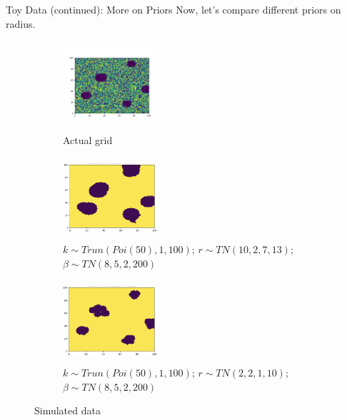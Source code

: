 \documentclass[10pt,mathserif]{beamer}
\begin{document}
\begin{frame}{Toy Data (continued): More on Priors}
Now, let's compare different priors on radius.
\begin{figure}[t!]
    \centering
    \begin{subfigure}[t]{0.3\textwidth}
        \centering
        \includegraphics[height=1.3in, width=1.4in]{../BDC_gridactual}
        \caption{Actual grid}
    \end{subfigure}%
    \begin{subfigure}[t]{0.3\textwidth}
        \centering
        \includegraphics[height=1.2in, width=1.4in]{../BDC_grid4}
        \caption{ $k \sim Trun(Poi(50), 1, 100)$; $r \sim TN(10, 2, 7, 13)$; $\beta \sim TN(8, 5, 2, 200)$}
    \end{subfigure}%
        \begin{subfigure}[t]{0.3\textwidth}
        \centering
        \includegraphics[height=1.2in, width=1.4in]{../BDC_grid5}
        \caption{ $k \sim Trun(Poi(50), 1, 100)$; $r \sim TN(2, 2, 1, 10)$; $\beta \sim TN(8, 5, 2, 200)$}
    \end{subfigure}
    \caption{Simulated data}
\end{figure}
\end{frame}
\end{document}

